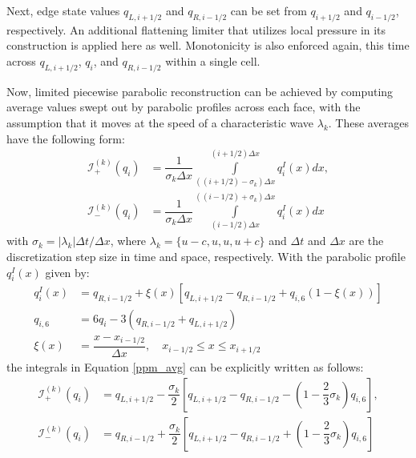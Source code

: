 Next, edge state values $q_{L, i+1/2}$ and $q_{R, i-1/2}$ can be set from $q_{i+1/2}$ and $q_{i-1/2}$, respectively. An additional flattening limiter that utilizes local pressure in its construction is applied here as well. Monotonicity is also enforced again, this time across $q_{L, i+1/2}$, $q_i$, and $q_{R, i-1/2}$ within a single cell. 

Now, limited piecewise parabolic reconstruction can be achieved by computing average values swept out by parabolic profiles across each face, with the assumption that it moves at the speed of a characteristic wave $\lambda_k$. These averages have the following form:
\begin{equation} \label{ppm_avg}
\begin{split}
\mathcal{I}_+^{(k)}(q_i) &= \dfrac{1}{\sigma_k \Delta x} \int\limits_{((i+1/2 )-\sigma_k)\Delta x}^{(i+1/2)\Delta x} q_i^I(x) dx, \\
\mathcal{I}_-^{(k)}(q_i) &= \dfrac{1}{\sigma_k \Delta x} \int\limits^{((i-1/2 )+\sigma_k)\Delta x}_{(i-1/2)\Delta x} q_i^I(x) dx
\end{split}
\end{equation}
with $\sigma_k = |\lambda_k |\Delta t/\Delta x$, where $\lambda_k = \{u-c, u, u, u+c\}$ and $\Delta t$ and $\Delta x$ are the discretization step size in time and space, respectively. With the parabolic profile $q_i^I(x)$ given by:
\begin{equation}
\begin{split}
q_i^I(x) &= q_{R,i-1/2} + \xi(x) \left[ q_{L, i+1/2} - q_{R, i-1/2} + q_{i,6}\left( 1 - \xi(x) \right) \right] \\
q_{i,6} &= 6q_i - 3 \left( q_{R, i-1/2} + q_{L,i+1/2}\right) \\
\xi(x) &= \dfrac{x - x_{i-1/2}}{\Delta x}, \quad x_{i-1/2} \leq x \leq x_{i+1/2}
\end{split}
\end{equation}
the integrals in Equation \eqref{ppm_avg} can be explicitly written as follows:
\begin{equation}
\begin{split}
\mathcal{I}_+^{(k)}(q_i) &= q_{L, i+1/2} - \dfrac{\sigma_k}{2} \left[ q_{L,i+1/2} - q_{R,i-1/2} - \left( 1 - \dfrac{2}{3}\sigma_k \right)q_{i,6} \right], \\
\mathcal{I}_-^{(k)}(q_i) &= q_{R, i-1/2} + \dfrac{\sigma_k}{2} \left[ q_{L,i+1/2} - q_{R,i-1/2} + \left( 1 - \dfrac{2}{3}\sigma_k \right)q_{i,6} \right] 
\end{split}
\end{equation}

